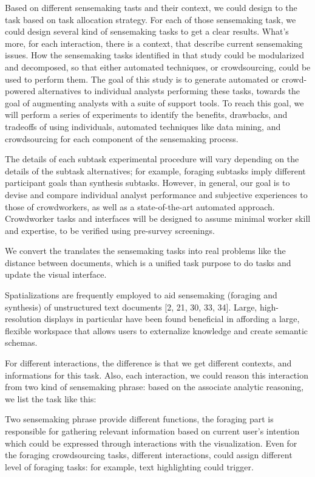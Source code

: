 \documentclass[journal]{vgtc}                %
\begin{document}
Based on different sensemaking tasts and their context, we could design to the task based on task allocation strategy.
For each of those sensemaking task, we could design several kind of sensemaking tasks to get a clear results.
What's more, for each interaction, there is a context, that describe current sensemaking issues.
How the sensemaking tasks identified in that study could be modularized and decomposed, so that either automated techniques, or crowdsourcing, could be used to perform them. The goal of this study is to generate automated or crowd-powered alternatives to individual analysts performing these tasks, towards the goal of augmenting analysts with a suite of support tools. To reach this goal, we will perform a series of experiments to identify the benefits, drawbacks, and tradeoffs of using individuals, automated techniques like data mining, and crowdsourcing for each component of the sensemaking process.

The details of each subtask experimental procedure will vary depending on the details of the subtask alternatives; for example, foraging subtasks imply different participant goals than synthesis subtasks. However, in general, our goal is to devise and compare individual analyst performance and subjective experiences to those of crowdworkers, as well as a state-of-the-art automated approach. Crowdworker tasks and interfaces will be designed to assume minimal worker skill and expertise, to be verified using pre-survey screenings.

We convert the translates the sensemaking tasks into real problems like the distance between documents, which is a unified task purpose to do tasks and update the visual interface.

Spatializations are frequently employed to aid sensemaking (foraging and synthesis) of unstructured text documents [2, 21, 30, 33, 34].
Large, high-resolution displays in particular have been found beneficial in affording a large, flexible workspace that allows users to externalize knowledge and create semantic schemas.

For different interactions, the difference is that we get different contexts, and informations for this task.
Also, each interaction, we could reason this interaction from two kind of sensemaking phrase: based on the associate analytic reasoning, we list the task like this:


Two sensemaking phrase provide different functions, the foraging part is responsible for gathering relevant information based on current user's intention which could be expressed through interactions with the visualization. Even for the foraging crowdsourcing tasks, different interactions, could assign different level of foraging tasks: for example, text highlighting could trigger.
\end{document}
